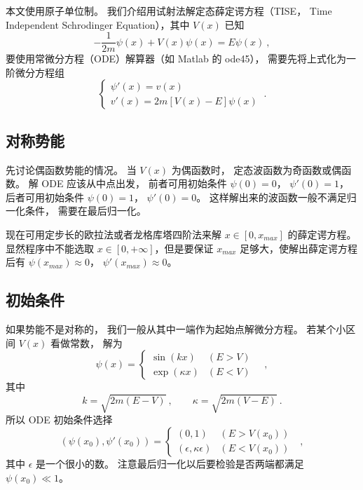 


本文使用原子单位制。 我们介绍用试射法解定态薛定谔方程（TISE， Time Independent Schrodinger Equation），其中 $V(x)$ 已知
\begin{equation}
-\frac{1}{2m}\psi(x) + V(x)\psi(x) = E \psi(x)~,
\end{equation}
要使用常微分方程（ODE）解算器（如 Matlab 的 ode45）， 需要先将上式化为一阶微分方程组
\begin{equation}
\begin{cases}
\psi'(x) = v(x)\\
v'(x) = 2m[V(x) - E]\psi(x)
\end{cases}~.
\end{equation}

\subsection{对称势能}
先讨论偶函数势能的情况。 当 $V(x)$ 为偶函数时， 定态波函数为奇函数或偶函数。 解 ODE 应该从中点出发， 前者可用初始条件 $\psi(0)=0$， $\psi'(0)=1$， 后者可用初始条件 $\psi(0)=1$， $\psi'(0)=0$。 这样解出来的波函数一般不满足归一化条件， 需要在最后归一化。

现在可用定步长的欧拉法或者龙格库塔四阶法来解 $x\in [0, x_{max}]$ 的薛定谔方程。 显然程序中不能选取 $x\in [0,+\infty]$，但是要保证 $x_{max}$ 足够大，使解出薛定谔方程后有 $\psi(x_{max})\approx 0$， $\psi'(x_{max})\approx 0$。

\subsection{初始条件}
如果势能不是对称的， 我们一般从其中一端作为起始点解微分方程。 若某个小区间 $V(x)$ 看做常数， 解为
\begin{equation}
\psi(x) =
\begin{cases}
\sin(kx) &(E > V)\\
\exp(\kappa x) & (E < V)
\end{cases}\quad,
\end{equation}
其中
\begin{equation}
k = \sqrt{2m(E - V)}~, \qquad
\kappa = \sqrt{2m(V - E)}~.
\end{equation}
所以 ODE  初始条件选择
\begin{equation}
(\psi(x_0), \psi'(x_0)) =
\begin{cases}
(0, 1) &(E > V(x_0))\\
(\epsilon, \kappa\epsilon) & (E < V(x_0))
\end{cases}~~~,
\end{equation}
其中 $\epsilon$ 是一个很小的数。 注意最后归一化以后要检验是否两端都满足 $\psi(x_0) \ll 1$。

